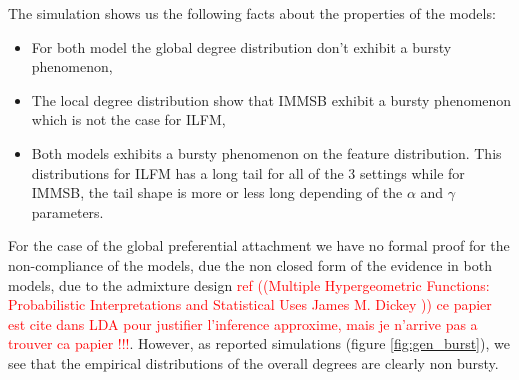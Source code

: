 The simulation shows us the following facts about the properties of the models:
\begin{itemize}
	\item For both model the global degree distribution don't exhibit a bursty phenomenon,
	\item The local degree distribution show that IMMSB exhibit a bursty phenomenon which is not the case for ILFM,
	\item Both models exhibits a bursty phenomenon on the feature distribution. This distributions for ILFM has a long tail for all of the 3 settings while for IMMSB, the tail shape is more or less long depending of the $\alpha$ and $\gamma$ parameters.
\end{itemize}

For the case of the global preferential attachment we have no formal proof for the non-compliance of the models, due the non closed form of the evidence in both models, due to the admixture design \textcolor{red}{ref ((Multiple Hypergeometric Functions: Probabilistic Interpretations and Statistical Uses
James M. Dickey )) ce papier est cite dans LDA pour justifier l'inference approxime, mais je n'arrive pas a trouver ca papier !!!}. However, as reported simulations (figure \ref{fig:gen_burst}), we see that the empirical distributions of the overall degrees are clearly non bursty.


